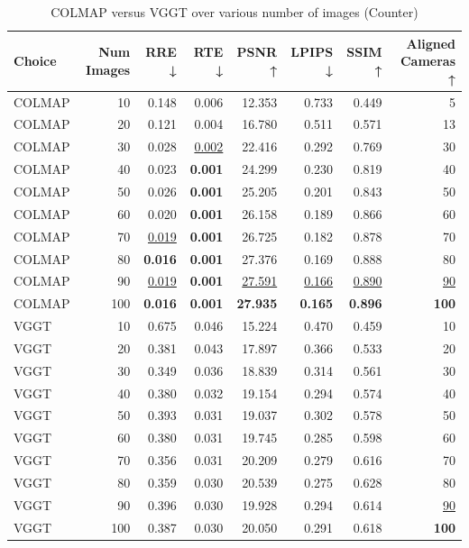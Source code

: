 \begin{table}[H]
\caption{\ifdefined\customcaption \customcaption \else COLMAP versus VGGT over various number of images (Counter) \fi}
\label{tab:01_num_images_brief_counter}
\centering
\scriptsize
\begin{tabular}{lrrrrrrr}
\toprule
Choice & Num Images & RRE ↓ & RTE ↓ & PSNR ↑ & LPIPS ↓ & SSIM ↑ & Aligned Cameras ↑ \\
\midrule
COLMAP & 10 & 0.148 & 0.006 & 12.353 & 0.733 & 0.449 & 5 \\
COLMAP & 20 & 0.121 & 0.004 & 16.780 & 0.511 & 0.571 & 13 \\
COLMAP & 30 & 0.028 & \underline{0.002} & 22.416 & 0.292 & 0.769 & 30 \\
COLMAP & 40 & 0.023 & \textbf{0.001} & 24.299 & 0.230 & 0.819 & 40 \\
COLMAP & 50 & 0.026 & \textbf{0.001} & 25.205 & 0.201 & 0.843 & 50 \\
COLMAP & 60 & 0.020 & \textbf{0.001} & 26.158 & 0.189 & 0.866 & 60 \\
COLMAP & 70 & \underline{0.019} & \textbf{0.001} & 26.725 & 0.182 & 0.878 & 70 \\
COLMAP & 80 & \textbf{0.016} & \textbf{0.001} & 27.376 & 0.169 & 0.888 & 80 \\
COLMAP & 90 & \underline{0.019} & \textbf{0.001} & \underline{27.591} & \underline{0.166} & \underline{0.890} & \underline{90} \\
COLMAP & 100 & \textbf{0.016} & \textbf{0.001} & \textbf{27.935} & \textbf{0.165} & \textbf{0.896} & \textbf{100} \\
VGGT & 10 & 0.675 & 0.046 & 15.224 & 0.470 & 0.459 & 10 \\
VGGT & 20 & 0.381 & 0.043 & 17.897 & 0.366 & 0.533 & 20 \\
VGGT & 30 & 0.349 & 0.036 & 18.839 & 0.314 & 0.561 & 30 \\
VGGT & 40 & 0.380 & 0.032 & 19.154 & 0.294 & 0.574 & 40 \\
VGGT & 50 & 0.393 & 0.031 & 19.037 & 0.302 & 0.578 & 50 \\
VGGT & 60 & 0.380 & 0.031 & 19.745 & 0.285 & 0.598 & 60 \\
VGGT & 70 & 0.356 & 0.031 & 20.209 & 0.279 & 0.616 & 70 \\
VGGT & 80 & 0.359 & 0.030 & 20.539 & 0.275 & 0.628 & 80 \\
VGGT & 90 & 0.396 & 0.030 & 19.928 & 0.294 & 0.614 & \underline{90} \\
VGGT & 100 & 0.387 & 0.030 & 20.050 & 0.291 & 0.618 & \textbf{100} \\
\bottomrule
\end{tabular}
\end{table}